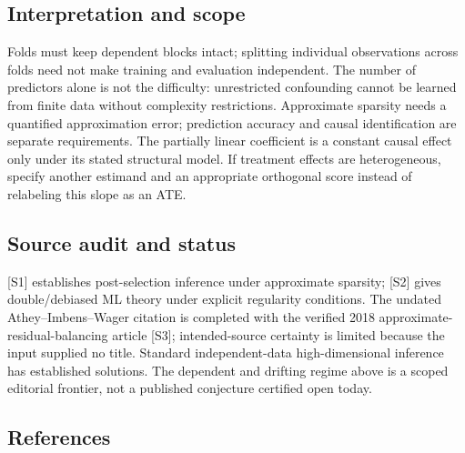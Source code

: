 \documentclass[11pt,a4paper]{article}
\begin{document}
\subsection*{Interpretation and scope}

Folds must keep dependent blocks intact; splitting individual observations across folds need not make training and evaluation independent. The number of predictors alone is not the difficulty: unrestricted confounding cannot be learned from finite data without complexity restrictions. Approximate sparsity needs a quantified approximation error; prediction accuracy and causal identification are separate requirements. The partially linear coefficient is a constant causal effect only under its stated structural model. If treatment effects are heterogeneous, specify another estimand and an appropriate orthogonal score instead of relabeling this slope as an ATE.

\subsection*{Source audit and status}

[S1] establishes post-selection inference under approximate sparsity; [S2] gives double/debiased ML theory under explicit regularity conditions. The undated Athey--Imbens--Wager citation is completed with the verified 2018 approximate-residual-balancing article [S3]; intended-source certainty is limited because the input supplied no title. Standard independent-data high-dimensional inference has established solutions. The dependent and drifting regime above is a scoped editorial frontier, not a published conjecture certified open today.

\subsection*{References}
\end{document}
